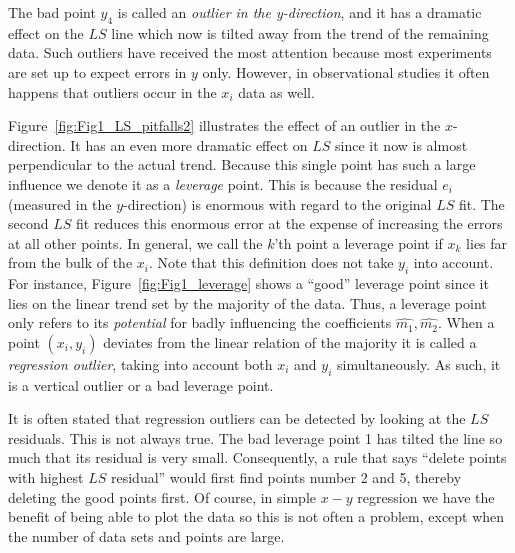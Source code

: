 
The bad point $y_4$  is called an \emph{outlier in the y-direction}, and it has a dramatic effect on the $LS$ line 
which now is tilted away from the trend of the remaining data.  Such outliers have received the most 
attention because most experiments are set up to expect errors in $y$ only.  However, in 
observational studies it often happens that outliers occur in the $x_i$ data as well.


Figure~\ref{fig:Fig1_LS_pitfalls2} illustrates the effect of an outlier in the $x$-direction.
It has an even more dramatic 
effect on $LS$ since it now is almost perpendicular to the actual trend.  Because this single point 
has such a large influence we denote it as a \emph{leverage} point.
This is because the residual $e_i$ 
(measured in the $y$-direction) is enormous with regard to the original $LS$ fit.  The second $LS$ fit 
reduces this enormous error at the expense of increasing the errors at all other points.  In 
general, we call the $k$'th  point a leverage point if $x_k$ lies far from the bulk of the $x_i$.  Note that this 
definition does not take $y_i$ into account.  For instance, Figure~\ref{fig:Fig1_leverage} shows a ``good'' leverage 
point since it lies on the linear trend set by the majority of the data.  Thus, a leverage point only 
refers to its \emph{potential} for badly influencing the coefficients $\hat{m_1}, \hat{m_2}$.
When a point $(x_i, y_i)$ deviates from the linear relation of the majority it is called a \emph{regression outlier},
taking into account both $x_i$ and $y_i$ simultaneously.  As such, it is a vertical outlier or a bad 
leverage point.
	

It is often stated that regression outliers can be detected by looking at the $LS$ residuals. This is 
not always true.  The bad leverage point 1 has tilted the line so much  that its residual is very 
small.  Consequently, a rule that says ``delete points with highest $LS$ residual'' would first find points 
number 2 and 5, thereby deleting the good points first.  Of course, in simple $x-y$ regression we have the 
benefit of being able to plot the data so this is not often a problem, except when the number of 
data sets and points are large.

